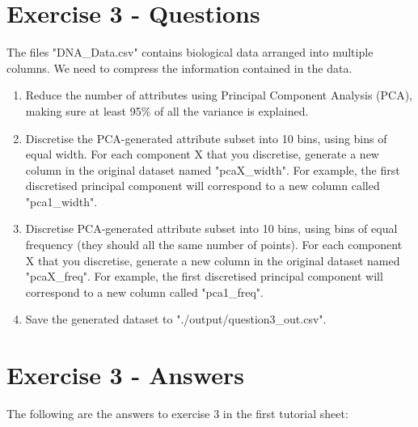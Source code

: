\documentclass{scrreprt}
\begin{document}
\section{Exercise 3 - Questions}
The files "DNA\_Data.csv" contains biological data arranged into multiple columns. We need to compress the information contained in the data.
\begin{enumerate}
\item Reduce the number of attributes using Principal Component Analysis (PCA), making sure at least 95\% of all the variance is explained.
\item Discretise the PCA-generated attribute subset into 10 bins, using bins of equal width. For each component X that you discretise, generate a new column in the original dataset named "pcaX\_width". For example, the first discretised principal component will correspond to a new column called "pca1\_width".
\item Discretise PCA-generated attribute subset into 10 bins, using bins of equal frequency (they should all the same number of points). For each component X that you discretise, generate a new column in the original dataset named "pcaX\_freq". For example, the first discretised principal component will correspond to a new column called "pca1\_freq".
\item Save the generated dataset to "./output/question3\_out.csv".
\end{enumerate}




\section{Exercise 3 - Answers}	
The following are the answers to exercise 3 in the first tutorial sheet:
\end{document}
